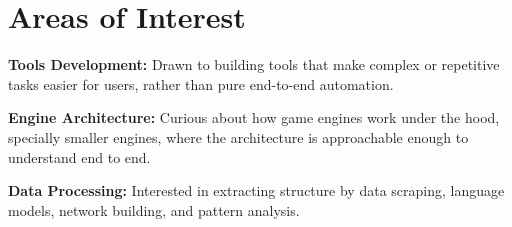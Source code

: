 \section{Areas of Interest}

\begin{onecolentry}
\textbf{Tools Development:} Drawn to building tools that make complex or repetitive tasks easier for users, rather than pure end-to-end automation.
\end{onecolentry}

\begin{onecolentry}
\textbf{Engine Architecture:} Curious about how game engines work under the hood, specially smaller engines, where the architecture is approachable enough to understand end to end.
\end{onecolentry}

\begin{onecolentry}
\textbf{Data Processing:} Interested in extracting structure by data scraping, language models, network building, and pattern analysis.
\end{onecolentry}